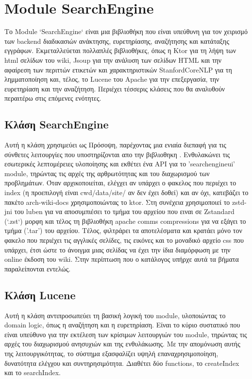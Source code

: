 \documentclass[conference]{IEEEtran}
\begin{document}
    \section{Module SearchEngine}{
        Το Module `SearchEngine` είναι μια βιβλιοθήκη που είναι υπεύθυνη για τον χειρισμό των backend διαδικασιών ανάκτησης, ευρετηρίασης, αναζήτησης και κατάταξης εγγράφων.
        Εκμεταλλεύεται πολλαπλές βιβλιοθήκες, όπως η Ktor για τη λήψη των html σελίδων του wiki,
        Jsoup για την ανάλυση των σελίδων HTML και την αφαίρεση των περιττών ετικετών και χαρακτηριστικών
        StanfordCoreNLP για τη λημματοποίηση
        και, τέλος, το Lucene του Apache για την επεξεργασία, την ευρετηρίαση και την αναζήτηση.
        Περιέχει τέσσερις κλάσεις που θα αναλυθούν περαιτέρω στις επόμενες ενότητες.


        \subsection{\textbf{Κλάση SearchEngine}}{Αυτή η κλάση χρησιμεύει ως Πρόσοψη, παρέχοντας μια ενιαία διεπαφή για τις σύνθετες λειτουργίες που υποστηρίζονται απο την βιβλιοθηκη .
        Ενθυλακώνει τις εσωτερικές λεπτομέρειες υλοποίησης και εκθέτει ένα API για το 'searchengineui' module, τηρώντας τις αρχές της αρθρωτότητας και του διαχωρισμού των προβλημάτων.
        Όταν αρχικοποιείται, ελέγχει αν υπάρχει ο φακελος που περιέχει το index (η προεπιλογή είναι cwd/data/site/ αν δεν έχει δοθεί) και αν όχι, κατεβάζει το πακέτο arch-wiki-docs χρησιμοποιώντας το ktor.
        Στη συνέχεια χρησιμοποιεί το zstd-jni του luben για να αποσυμπιέσει το τμήμα του αρχείου που ειναι σε Zstandard (`.zst`) μορφη και τέλος τη βιβλιοθήκη apache comms compressions για να εξάγει το τμήμα ('.tar') του αρχείου.
        Τέλος, φιλτράρει τα αποτελέσματα και κρατάει μόνο τον φακελο που περιέχει τις αγγλικές σελίδες, τις εικόνες και το μοναδικό αρχείο css που υπάρχει, έτσι ώστε το άνοιγμα μιας σελίδας να έχει την ίδια διαμόρφωση με την online έκδοση του wiki.
        Στην περίπτωση που ο κατάλογος υπήρχε αυτά τα βήματα παραλείπονται εντελώς.

        }\label{searchengine-class}

        \subsection{\textbf{Κλάση Lucene}}{Αυτή η κλάση αντιπροσωπεύει τη βασική λογική του module, υλοποιώντας το domain logic, όπως η αναζήτηση και η ευρετηρίαση.
        Είναι το κύριο συστατικό που είναι υπεύθυνο για την εκτέλεση των κρίσιμων λειτουργιών του module, τηρώντας τις αρχές του διαχωρισμού ανησυχιών και της ενθυλάκωσης.
        Με την απομόνωση αυτής της λειτουργικότητας, το σύστημα εξασφαλίζει υψηλή επαναχρησιμοποίηση, δυνατότητα ελέγχου και συντηρησιμότητα.
        Διαθέτει δύο functions, το createIndex και το searchIndex.

}}
\end{document}
